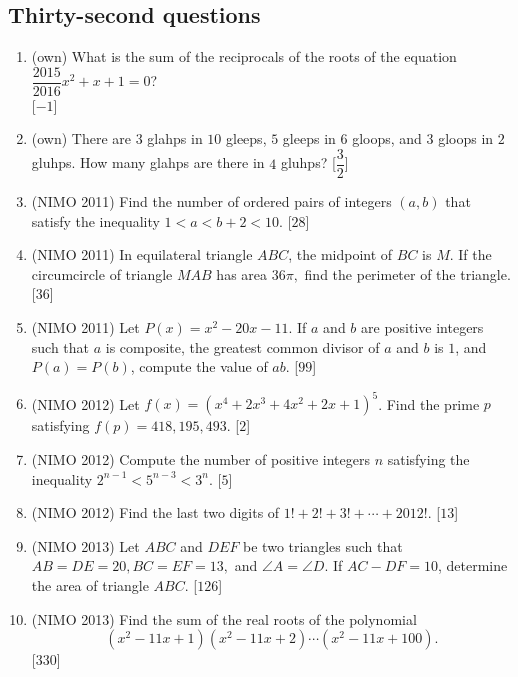 \documentclass[11pt,paper=letter]{scrartcl}
\begin{document}
\subsection{Thirty-second questions}

\begin{enumerate}

\item (own) What is the sum of the reciprocals of the roots of the equation $\dfrac{2015}{2016}x^2 + x + 1 = 0$? \\ \phantom{.} \hfill [$-1$]

\item (own) There are $3$ glahps in $10$ gleeps, $5$ gleeps in $6$ gloops, and $3$ gloops in $2$ gluhps. How many glahps are there in $4$ gluhps? \hfill [$\dfrac{3}{2}$]

\item (NIMO 2011) Find the number of ordered pairs of integers $(a, b)$ that satisfy the inequality $1 < a < b + 2 < 10$. \phantom{.} \hfill [$28$]

\item (NIMO 2011) In equilateral triangle $ABC$, the midpoint of $BC$ is $M$. If the circumcircle of triangle $MAB$ has area $36\pi,$ find the perimeter of the triangle. \hfill [$36$]

\item (NIMO 2011) Let $P(x) = x^2 - 20x - 11$. If $a$ and $b$ are positive integers such that $a$ is composite, the greatest common divisor of $a$ and $b$ is $1$, and $P(a) = P(b)$, compute the value of $ab$. \hfill [$99$]

\item (NIMO 2012) Let $f(x) = (x^4 + 2x^3 + 4x^2 + 2x + 1)^5$. Find the prime $p$ satisfying $f(p) = 418,195,493$. \hfill [$2$]

\item (NIMO 2012) Compute the number of positive integers $n$ satisfying the inequality $2^{n-1} < 5^{n-3} < 3^n$. \hfill [$5$]

\item (NIMO 2012) Find the last two digits of $1! + 2! + 3! + \cdots + 2012!$. \hfill [$13$]

\item (NIMO 2013) Let $ABC$ and $DEF$ be two triangles such that $AB = DE = 20, BC = EF = 13,$ and $\angle A = \angle D$. If $AC - DF = 10$, determine the area of triangle $ABC$. \hfill [$126$]

\item (NIMO 2013) Find the sum of the real roots of the polynomial $$(x^2 - 11x + 1)(x^2 - 11x + 2)\cdots(x^2 - 11x + 100).$$ \hfill [$330$]


\end{enumerate}
\end{document}
